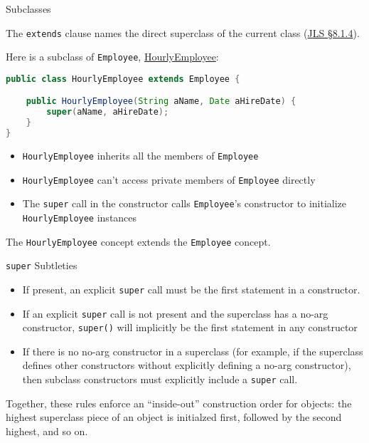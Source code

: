 \documentclass{beamer}
\newcommand{\code}{http://www.cc.gatech.edu/~simpkins/teaching/gatech/cs1331/code}
\begin{document}
\begin{frame}[fragile]{Subclasses}


The {\tt extends} clause names the direct superclass of the current class (\href{http://docs.oracle.com/javase/specs/jls/se7/html/jls-8.html#jls-8.1.4)}{JLS \S 8.1.4}).

Here is a subclass of {\tt Employee},  \href{\code/HourlyEmployee.java}{HourlyEmployee}:
\begin{lstlisting}[language=Java]
public class HourlyEmployee extends Employee {

    public HourlyEmployee(String aName, Date aHireDate) {
        super(aName, aHireDate);
    }
}
\end{lstlisting}

\begin{itemize}
\item {\tt HourlyEmployee} inherits all the members of {\tt Employee}
\item {\tt HourlyEmployee} can't access private members of {\tt Employee} directly
\item The {\tt super} call in the constructor calls {\tt Employee}'s constructor to initialize {\tt HourlyEmployee} instances
\end{itemize}
The {\tt HourlyEmployee} concept extends the {\tt Employee} concept.

\end{frame}

\begin{frame}[fragile]{{\tt super} Subtleties}


\begin{itemize}
\item If present, an explicit {\tt super} call must be the first statement in a constructor.
\item If an explicit {\tt super} call is not present and the superclass has a no-arg constructor, {\tt super()} will implicitly be the first statement in any constructor
\item If there is no no-arg constructor in a superclass (for example, if the superclass defines other constructors without explicitly defining a no-arg constructor), then subclass constructors must explicitly include a {\tt super} call.
\end{itemize}
Together, these rules enforce an ``inside-out'' construction order for objects: the highest superclass piece of an object is initialzed first, followed by the second highest, and so on.

\end{frame}
\end{document}
